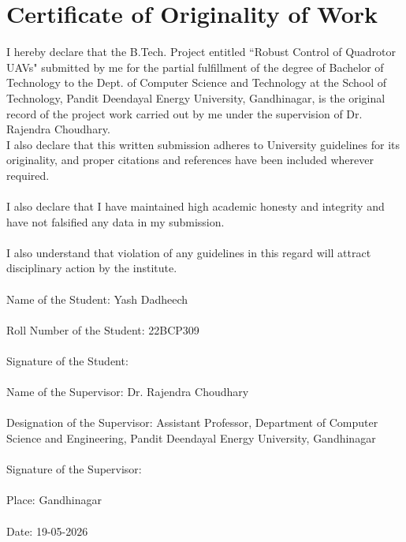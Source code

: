 \chapter*{\center \Large  Certificate of Originality of Work}

I hereby declare that the B.Tech. Project entitled ``Robust Control of Quadrotor UAVs" submitted by me for the partial fulfillment of the degree of Bachelor of Technology to the Dept. of Computer Science and Technology at the School of Technology, Pandit Deendayal Energy University, Gandhinagar, is the original record of the project work carried out by me under the supervision of Dr. Rajendra Choudhary.\\

I also declare that this written submission adheres to University guidelines for its originality, and proper citations and references have been included wherever required.\\
\\
I also declare that I have maintained high academic honesty and integrity and have not falsified any data in my submission.\\
\\
I also understand that violation of any guidelines in this regard will attract disciplinary action by the institute.\\
\\
Name of the Student: Yash Dadheech\\
\\
Roll Number of the Student: 22BCP309\\
\\
Signature of the Student: \\
\\
Name of the Supervisor: Dr. Rajendra Choudhary \\
\\
Designation of the Supervisor: Assistant Professor, Department of Computer Science and Engineering, Pandit Deendayal Energy University, Gandhinagar\\
\\
Signature of the Supervisor: \\
\\
Place: Gandhinagar\\
\\
Date: 19-05-2026

